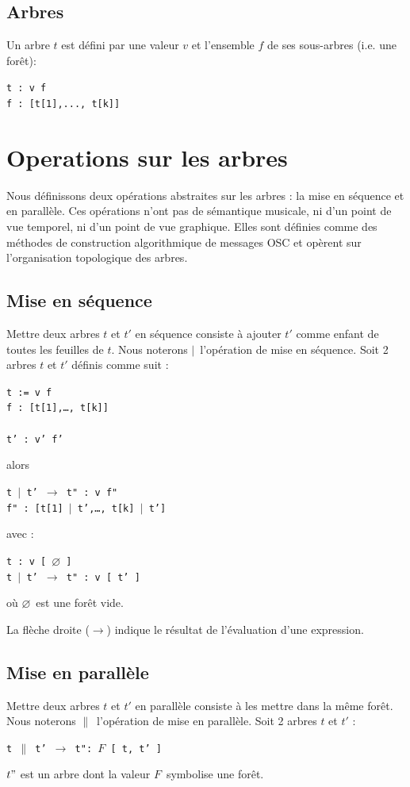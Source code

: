 \documentclass{article}
\newcommand{\code}	[2][0.9]		{\vspace{0mm}\begin{center}\colorbox{mygrey}{
							\begin{minipage}[t]{#1\columnwidth} 
							{\small \texttt{#2}}
							\end{minipage}}\end{center}}
\newcommand{\op}	[1]		{\vspace{0mm}\begin{center}\colorbox{mygrey}{
							\begin{minipage}[t]{0.9\columnwidth} 
							{\small \texttt{#1}}
							\end{minipage}}\end{center}}
\newcommand{\nulltree}	{\ensuremath{\varnothing}}
\newcommand{\seq}		{\ensuremath{|}}
\newcommand{\paral}		{\ensuremath{\parallel}}
\newcommand{\foret}		{\ensuremath{F}}
\newcommand{\etc}		{…}
\begin{document}
\subsection{Arbres}
Un arbre $t$ est défini par une valeur $v$ et l’ensemble $f$ de ses sous-arbres (i.e. une forêt):
\code{t :  v f \\
f : [t[1],..., t[k]]
}



\section{Operations sur les arbres}

Nous définissons deux opérations abstraites sur les arbres : la mise en séquence et en parallèle. Ces opérations n'ont pas de sémantique musicale, ni d'un point de vue temporel, ni d'un point de vue graphique. Elles sont définies comme des méthodes de construction algorithmique de messages OSC et opèrent sur l'organisation topologique des arbres. 

\subsection{Mise en séquence}
Mettre deux arbres $t$ et $t'$ en séquence consiste à ajouter $t'$ comme enfant de toutes les feuilles de $t$.
Nous noterons \seq\ l'opération de mise en séquence. Soit 2 arbres $t$ et $t'$ définis comme suit :
\op{t :=  v f \\
f : [t[1],\etc, t[k]] \\
\\
t' :  v' f'
}
alors
\op{t \seq\ t'  $\to$  t" : v f" \\
f" : [t[1] \seq\ t',\etc, t[k] \seq\ t']
}
avec : 
\op{t :  v [ \nulltree\ ]\\
t \seq\ t'  $\to$  t" : v [ t' ]
}
où \nulltree\ est une forêt vide.

La flèche droite ($\to$) indique le résultat de l'évaluation d'une expression.

\subsection{Mise en parallèle}
Mettre deux arbres $t$ et $t'$ en parallèle consiste à les mettre dans la même forêt.
Nous noterons \paral\ l'opération de mise en parallèle. 
Soit 2 arbres $t$ et $t'$ :
\op{t \paral\ t'  $\to$  t": \foret\ [ t, t' ]
}
$t"$ est un arbre dont la valeur \foret\ symbolise une forêt. 
\end{document}

